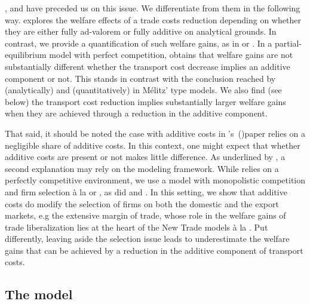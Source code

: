\documentclass[a4paper,11pt]{article}
\newcommand\cites[1]{\citeauthor{#1}'s\ (\citeyear{#1})}
\begin{document}
\cite{Irrazabal_2015}, \cite{sorensen2014} and \cite{Lashkaripour_JIE2020} have preceded us on this issue. We differentiate from them in the following way. \cite{sorensen2014} explores the welfare effects of a trade costs reduction depending on whether they are either fully ad-valorem or fully additive on analytical grounds. In contrast, we provide a quantification of such welfare gains, as in \cite{Irrazabal_2015} or \cite{Lashkaripour_JIE2020}. In a partial-equilibrium model with perfect competition, \cite{Lashkaripour_JIE2020} obtains that welfare gains are not substantially different whether the transport cost decrease implies an additive component or not. This stands in contrast with the conclusion reached by \cite{sorensen2014} (analytically) and \cite{Irrazabal_2015} (quantitatively) in M\'{e}litz' type models. We also find (see below) the transport cost reduction implies substantially larger welfare gains when they are achieved through a reduction in the additive component.

That said, it should be noted the case with additive costs in \cites{Lashkaripour_JIE2020}paper relies on a negligible share of additive costs. In this context, one might expect that whether additive costs are present or not makes little difference. As underlined by \cite{Lashkaripour_JIE2020}, a second explanation may rely on the modeling framework. While \cite{Lashkaripour_JIE2020} relies on a perfectly competitive environment, we use a model with monopolistic competition and firm selection \`{a} la \cite{melitz} or \cite{chaney2008}, as did \cite{sorensen2014} and \cite{Irrazabal_2015}. In this setting, we show that additive costs do modify the selection of firms on both the domestic and the export markets, e.g the extensive margin of trade, whose role in the welfare gains of trade liberalization lies at the heart of the New Trade models  \`{a} la \cite{melitz}. Put differently, leaving aside the selection issue leads to underestimate the welfare gains that can be achieved by a reduction in the additive component of transport costs.

\subsection{The model}
\end{document}
